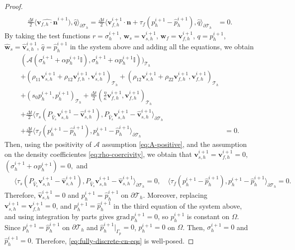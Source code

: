 \documentclass[10pt,letterpaper]{amsart}
\theoremstyle{plain} %
\theoremstyle{remark} %
\newcommand{\vect}[1]{\mathbf{#1}}
\newcommand{\grad}{\mathrm{grad}\,}
\newcommand{\Id}{\mathbb{I}} %
\newcommand{\Ael}{\mathcal{A}} %
\newcommand{\Thprod}[2]{( #1, #2 )_{\mathcal{T}_h}}
\newcommand{\pThprod}[2]{\langle #1, #2 \rangle_{\partial \mathcal{T}_{h}}}
\begin{document}
\begin{proof}
\begin{align*}
			\\
			\frac{\Delta t}{2}\pThprod{\widehat{\vect{v}_{f,h}\cdot \vect{n}}^{i+1})}{\widehat{q}}=
			\frac{\Delta t}{2}\pThprod{\vect{v}_{f,h}^{i+1}\cdot \vect{n} + \tau_f (p_h^{i+1} - \widehat{p}_h^{i+1})}{\widehat{q}} &= 0 .
		\end{align*}
	By taking the test functions $r = \sigma_h^{i+1}$, $\vect{w}_{s} = \vect{v}_{s,h}^{i+1}$, $\vect{w}_{f} = \vect{v}_{f,h}^{i+1}$, $q = p_h^{i+1}$, $\widehat{\vect{w}}_{s} = \widehat{\vect{v}}_{s,h}^{i+1}$, $\widehat{q}=\widehat{p}_{h}^{i+1}$ in the system above and adding all the equations, we obtain
	\begin{align*}
		\Thprod{\Ael({\sigma}_{h}^{i+1} + \alpha {p}_{h}^{i+1} \Id)}{{\sigma}_{h}^{i+1} + \alpha {p}_{h}^{i+1} \Id)}
        \\
		+ \Thprod{\rho_{11}\vect{v}_{s,h}^{i+1} +\rho_{12}\vect{v}_{f,h}^{i+1}}{\vect{v}_{s,h}^{i+1}} +\Thprod{\rho_{12}\vect{v}_{s,h}^{i+1}+\rho_{22}\vect{v}_{f,h}^{i+1}}{\vect{v}_{f,h}^{i+1}} 
		\\
		+ \Thprod{s_{0}p_h^{i+1}}{p_h^{i+1}} + \frac{\Delta t}{2} \Thprod{\frac{\eta}{\kappa} \vect{v}_{f,h}^{i+1}}{\vect{v}_{f,h}^{i+1}} 
		\\
		+ \frac{\Delta t}{2}  \pThprod{\tau_{s} ({P_{\widehat{V}_s}} \vect{v}_{s,h}^{i+1} - \widehat{\vect{v}}_{s,h}^{i+1})}{P_{\widehat{V}_s}\vect{v}_{s,h}^{i+1}-\widehat{\vect{v}}_{s,h}^{i+1}}
		\\
		+ \frac{\Delta t}{2} \pThprod{\tau_{f} (p_{h}^{i+1} - \widehat{p}_{h}^{i+1})}{p_h^{i+1}-\widehat{p}_h^{i+1}}&=0 . 
	\end{align*}
	Then, using the positivity of $\Ael$ assumption \eqref{eq:A-positive},  and the assumption on the density coefficientes \eqref{eq:rho-coercivity}, we obtain that 
	$\vect{v}_{s,h}^{i+1}= \vect{v}_{f,h}^{i+1} =   0$, $ (\sigma_h^{i+1} + \alpha p_h^{i+1}) = 0, $ and 
	\begin{align*}
		\quad \pThprod{\tau_{s} ({P_{\widehat{V}_s}} \vect{v}_{s,h}^{i+1} - \widehat{\vect{v}}_{s,h}^{i+1})}{P_{\widehat{V}_s}\vect{v}_{s,h}^{i+1}-\widehat{\vect{v}}_{s,h}^{i+1}} = 0, \quad 
		\pThprod{\tau_{f} (p_{h}^{i+1} - \widehat{p}_{h}^{i+1})}{p_h^{i+1}-\widehat{p}_h^{i+1}} = 0. 
	\end{align*}
	Therefore, $\widehat{\vect{v}}_{s,h}^{i+1} = 0$ and $p_h^{i+1} = \widehat{p}_h^{i+1}$ on $\partial \mathcal{T}_h$. Moreover, replacing $\vect{v}_{s,h}^{i+1}= \vect{v}_{f,h}^{i+1} =   0$, and $p_h^{i+1} = \widehat{p}_h^{i+1}$ in the third equation of the system above, and using integration by parts gives $\grad p_h^{i+1} = 0$, so $p_h^{i+1}$ is constant on $\Omega$. Since $p_h^{i+1} = \widehat{p}_h^{i+1}$ on $\partial \mathcal{T}_h$ and $\widehat{p}_h^{i+1}|_{\Gamma_p} = 0$, $p_h^{i+1} = 0$ on $\Omega$. Then, $\sigma_h^{i+1} = 0$ and $\widehat{p}_h^{i+1} =0$. Therefore, \eqref{eq:fully-discrete-cn-eqs} is well-posed.
\end{proof}
\end{document}
